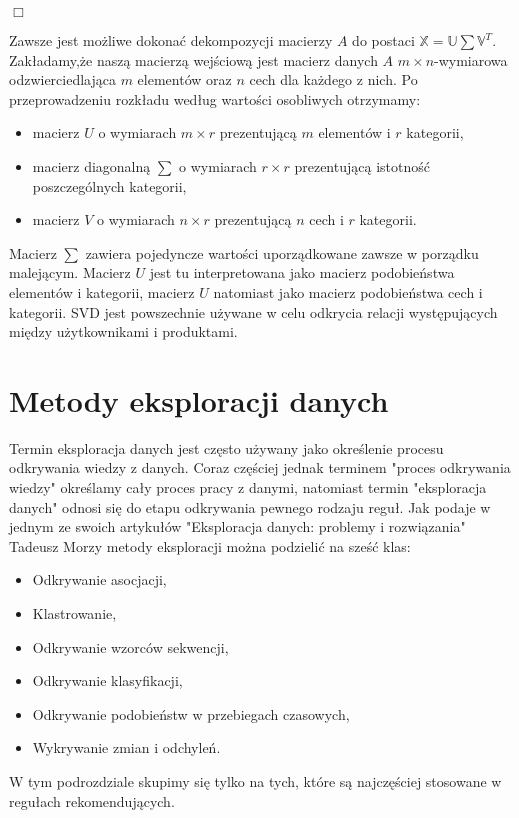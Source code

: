 \documentclass[12pt,a4paper]{report}
\begin{document}
\begin{flushright}
$\Box$
\end{flushright}
\bigskip
\bigskip
Zawsze jest możliwe dokonać dekompozycji macierzy $A$ do postaci $\mathbb{X}=\mathbb{U}\sum \mathbb{V}^T$.
Zakładamy,że naszą macierzą wejściową jest macierz danych $A$ $m \times n$-wymiarowa odzwierciedlająca $m$ elementów oraz $n$ cech dla każdego z nich. Po przeprowadzeniu rozkładu według wartości osobliwych otrzymamy:
\begin{itemize}
\item macierz $U$ o wymiarach $m \times r$ prezentującą $m$ elementów i $r$ kategorii,
\item macierz diagonalną $\sum$ o wymiarach $r \times r$ prezentującą istotność poszczególnych kategorii,
\item macierz $V$ o wymiarach $n \times r$ prezentującą $n$ cech i $r$ kategorii.
\end{itemize}
Macierz $\sum$ zawiera pojedyncze wartości uporządkowane zawsze w porządku malejącym. Macierz $U$ jest tu interpretowana jako macierz podobieństwa elementów i kategorii, macierz $U$ natomiast jako macierz podobieństwa cech i kategorii. 
SVD jest powszechnie używane w celu odkrycia relacji występujących między użytkownikami i produktami.
\section{Metody eksploracji danych}
Termin eksploracja danych jest często używany jako określenie procesu odkrywania wiedzy z danych. Coraz częściej jednak terminem  "proces odkrywania wiedzy" określamy cały proces pracy z danymi, natomiast termin "eksploracja danych" odnosi się do etapu odkrywania pewnego rodzaju reguł.
Jak podaje w jednym ze swoich artykułów "Eksploracja danych: problemy i rozwiązania" Tadeusz Morzy metody eksploracji można podzielić na sześć klas:
\begin{itemize}
\item Odkrywanie asocjacji,
\item Klastrowanie,
\item Odkrywanie wzorców sekwencji,
\item Odkrywanie klasyfikacji,
\item Odkrywanie podobieństw w przebiegach czasowych,
\item Wykrywanie zmian i odchyleń.
\end{itemize}
W tym podrozdziale skupimy się tylko na tych, które są najczęściej stosowane w regułach rekomendujących.
\end{document}
